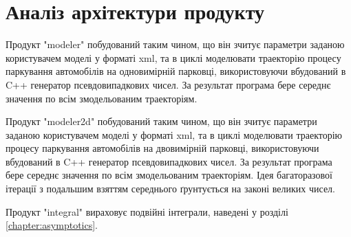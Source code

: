 \section{Аналіз архітектури продукту}

Продукт "modeler" побудований таким чином, що він зчитує параметри заданою користувачем моделі у форматі xml, та в циклі моделювати траекторію процесу паркування автомобілів на одновимірній парковці, використовуючи вбудований в C++ генератор псевдовипадкових чисел. За результат програма бере середнє значення по всім змодельованим траекторіям.

Продукт "modeler2d" побудований таким чином, що він зчитує параметри заданою користувачем моделі у форматі xml, та в циклі моделювати траекторію процесу паркування автомобілів на двовимірній парковці, використовуючи вбудований в C++ генератор псевдовипадкових чисел. За результат програма бере середнє значення по всім змодельованим траекторіям. Ідея багаторазової ітерації з подальшим взяттям середнього ґрунтується на законі великих чисел.

Продукт "integral" вираховує подвійні інтеграли, наведені у розділі \ref{chapter:asymptotics}.
